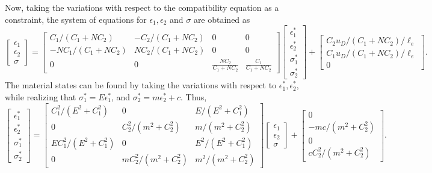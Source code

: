 \documentclass[10pt,review]{cas-sc}
\begin{document}
Now, taking the variations with respect to the compatibility equation as a constraint, the system of equations for $\epsilon_1,\epsilon_2$ and $\sigma$ are obtained as 
\begin{equation}
	\begin{bmatrix}
		\epsilon_1 \\
		\epsilon_2 \\
		\sigma
	\end{bmatrix}
	=
	\begin{bmatrix}
		C_1/(C_1+NC_2) & -C_2/(C_1+NC_2) & 0 & 0 \\
		-NC_1/(C_1+NC_2) & NC_2/(C_1+NC_2) & 0 & 0 \\
		0 & 0 & \frac{NC_2}{C_1+N C_2} & \frac{C_1}{C_1+N C_2}
	\end{bmatrix}
	\begin{bmatrix}
		\epsilon_1^* \\
		\epsilon_2^* \\
		\sigma_1^* \\
		\sigma_2^* 
	\end{bmatrix}
	+
	\begin{bmatrix}
		C_2 u_D/(C_1+NC_2)/\ell_e \\
		C_1 u_D/(C_1+NC_2)/\ell_e  \\
		0	
	\end{bmatrix}
	. \label{big_update_mech}
\end{equation}
The material states can be found by taking the variations with respect to $\epsilon_1^*, \epsilon_2^*$, while realizing that $\sigma_1^*=E\epsilon_1^*$, and $\sigma_2^*=m\epsilon_2^*+c$. Thus,
\begin{equation}
	\begin{bmatrix}
		\epsilon_1^* \\
		\epsilon_2^* \\
		\sigma_1^* \\
		\sigma_2^* 
	\end{bmatrix} 
	= 
	\begin{bmatrix}
		C_1^2/(E^2 + C_1^2) & 0 & E/(E^2 + C_1^2) \\
		0 & C_2^2/(m^2 + C_2^2)  & m/(m^2 + C_2^2) \\
		E C_1^2/(E^2 + C_1^2) & 0 & E^2/(E^2 + C_1^2)\\
		0 & mC_2^2/(m^2 + C_2^2)  & m^2/(m^2 + C_2^2) 
	\end{bmatrix} 
	\begin{bmatrix}
		\epsilon_1 \\
		\epsilon_2 \\
		\sigma
	\end{bmatrix} + 
	\begin{bmatrix}
		0 \\
		-mc/(m^2+C_2^2) \\
		0 \\
		cC_2^2/(m^2+C_2^2)
	\end{bmatrix} .\label{big_update_mat}
\end{equation}
\end{document}
